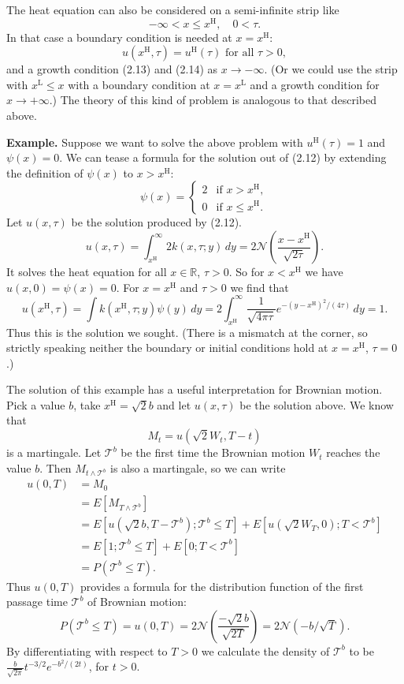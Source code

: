 The heat equation can also be considered on a semi-infinite strip like
\[
-\infty < x \leq x^{\mathrm{H}}, \quad 0 < \tau.
\]
In that case a boundary condition is needed at \(x = x^{\mathrm{H}}\):
\[
u(x^{\mathrm{H}},\tau) = u^{\mathrm{H}}(\tau) \text{ for all } \tau > 0,
\]
and a growth condition (2.13) and (2.14) as \(x \to -\infty\). (Or we could use the strip with \(x^{\mathrm{L}} \leq x\) with a boundary condition at \(x = x^{\mathrm{L}}\) and a growth condition for \(x \to +\infty\).) The theory of this kind of problem is analogous to that described above.

\textbf{Example.} Suppose we want to solve the above problem with \(u^{\mathrm{H}}(\tau) = 1\) and \(\psi(x) = 0\). We can tease a formula for the solution out of (2.12) by extending the definition of \(\psi(x)\) to \(x > x^{\mathrm{H}}\):
\[
\psi(x) = \begin{cases}
2 & \text{if } x > x^{\mathrm{H}}, \\
0 & \text{if } x \leq x^{\mathrm{H}}.
\end{cases}
\]
Let \(u(x,\tau)\) be the solution produced by (2.12).
\[
u(x,\tau) = \int_{x^{\mathrm{H}}}^{\infty} 2 k(x,\tau; y) \, dy = 2 \mathcal{N}\left( \frac{x - x^{\mathrm{H}}}{\sqrt{2\tau}} \right).
\]
It solves the heat equation for all \(x \in \mathbb{R}\), \(\tau > 0\). So for \(x < x^{\mathrm{H}}\) we have \(u(x,0) = \psi(x) = 0\). For \(x = x^{\mathrm{H}}\) and \(\tau > 0\) we find that
\[
u(x^{\mathrm{H}},\tau) = \int k(x^{\mathrm{H}},\tau; y) \psi(y) \, dy = 2 \int_{x^{\mathrm{H}}}^{\infty} \frac{1}{\sqrt{4\pi \tau}} e^{-(y - x^{\mathrm{H}})^2 / (4\tau)} \, dy = 1.
\]
Thus this is the solution we sought. (There is a mismatch at the corner, so strictly speaking neither the boundary or initial conditions hold at \(x = x^{\mathrm{H}}\), \(\tau = 0\).) 

The solution of this example has a useful interpretation for Brownian motion. Pick a value \(b\), take \(x^{\mathrm{H}} = \sqrt{2} b\) and let \(u(x,\tau)\) be the solution above. We know that
\[
M_t = u(\sqrt{2} W_t, T - t)
\]
is a martingale. Let \(\mathcal{T}^b\) be the first time the Brownian motion \(W_t\) reaches the value \(b\). Then \(M_{t \wedge \mathcal{T}^b}\) is also a martingale, so we can write
\begin{align*}
u(0,T) &= M_0 \\
&= E[M_{T \wedge \mathcal{T}^b}] \\
&= E[u(\sqrt{2} b, T - \mathcal{T}^b); \mathcal{T}^b \leq T] + E[u(\sqrt{2} W_T, 0); T < \mathcal{T}^b] \\
&= E[1; \mathcal{T}^b \leq T] + E[0; T < \mathcal{T}^b] \\
&= P(\mathcal{T}^b \leq T).
\end{align*}
Thus \(u(0,T)\) provides a formula for the distribution function of the first passage time \(\mathcal{T}^b\) of Brownian motion:
\[
P(\mathcal{T}^b \leq T) = u(0,T) = 2 \mathcal{N}\left( \frac{-\sqrt{2} b}{\sqrt{2T}} \right) = 2 \mathcal{N}\left( -b / \sqrt{T} \right).
\]
By differentiating with respect to \(T > 0\) we calculate the density of \(\mathcal{T}^b\) to be \(\frac{b}{\sqrt{2\pi}} t^{-3/2} e^{-b^2/(2t)}\), for \(t > 0\).

